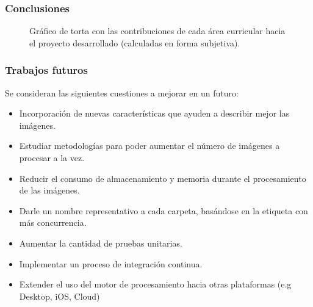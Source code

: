 \begin{frame}[t,fragile]
\frametitle {Conclusiones}

\begin{figure}
	\centering
	
	\caption{Gráfico de torta con las contribuciones de cada área curricular hacia el proyecto desarrollado (calculadas en forma subjetiva).}
	\label{fig:pie-plot-asignaturas}
\end{figure}

\end{frame}
\begin{frame}[t,fragile]
\frametitle {Trabajos futuros}
Se consideran las siguientes cuestiones a mejorar en un futuro:

\begin{itemize}
	\item Incorporación de nuevas características que ayuden a describir mejor las imágenes.
	
	\item Estudiar metodologías para poder aumentar el número de imágenes a procesar a la vez.
	
	\item Reducir el consumo de almacenamiento y memoria durante el procesamiento de las imágenes.
	
	\item Darle un nombre representativo a cada carpeta, basándose en la etiqueta con más concurrencia.
	
	\item Aumentar la cantidad de pruebas unitarias.
	
	\item Implementar un proceso de integración continua.
	
	\item Extender el uso del motor de procesamiento hacia otras plataformas (e.g Desktop, iOS, Cloud)
\end{itemize}
\end{frame}

